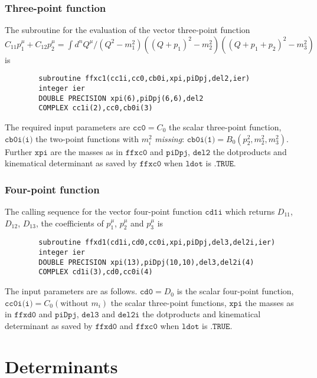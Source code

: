 \documentclass[twoside,12pt]{report}
\def\Code#1{\ensuremath{\texttt{#1}}}
\begin{document}
\begin{appendix}
\subsubsection{Three-point function}

The subroutine for the evaluation of the vector three-point function $C_{11} 
p_1^\mu + C_{12} p_2^\mu = \int d^n Q^\mu / (Q^2-m_1^2) ((Q+p_1)^2-m_2^2) 
((Q+p_1+p_2)^2-m_3^2)$ is
\begin{verbatim}
        subroutine ffxc1(cc1i,cc0,cb0i,xpi,piDpj,del2,ier)
        integer ier                            
        DOUBLE PRECISION xpi(6),piDpj(6,6),del2
        COMPLEX cc1i(2),cc0,cb0i(3)            
\end{verbatim}
The required input parameters are $\Code{cc0} = C_0$ the scalar 
three-point function, $\Code{cb0i(i)}$ the two-point functions with 
$m_i^2$ {\em missing}: $\Code{cb0i(1)} = B_0(p_2^2,m_2^2,m_3^2)$.  
Further \Code{xpi} are the masses as in \Code{ffxc0} and \Code{piDpj}, 
\Code{del2} the dotproducts and kinematical determinant as saved by 
\Code{ffxc0} when \Code{ldot} is \Code{.TRUE.}


\subsubsection{Four-point function}

The calling sequence for the vector four-point function \Code{cd1i} which 
returns $D_{11}$, $D_{12}$, $D_{13}$, the coefficients of $p_1^\mu$, $p_2^\mu$ 
and $p_3^\mu$ is
\begin{verbatim}
        subroutine ffxd1(cd1i,cd0,cc0i,xpi,piDpj,del3,del2i,ier)
        integer ier                                        
        DOUBLE PRECISION xpi(13),piDpj(10,10),del3,del2i(4)
        COMPLEX cd1i(3),cd0,cc0i(4)                        
\end{verbatim}
The input parameters are as follows.  $\Code{cd0} = D_0$ is the scalar 
four-point function, $\Code{cc0i(i)} = C_0(\mbox{without }m_i)$ the scalar 
three-point functions, \Code{xpi} the masses as in \Code{ffxd0} and \Code{piDpj}, 
\Code{del3} and \Code{del2i} the dotproducts and kinematical determinant as 
saved by \Code{ffxd0} and \Code{ffxc0} when \Code{ldot} is \Code{.TRUE.}

\section{Determinants}
\label{sc:determinants}


\end{appendix}
\end{document}
